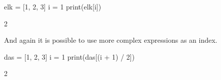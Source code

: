 \begin{minipage}[t]{0.5\textwidth}
\begin{listing}
elk = [1, 2, 3]
i = 1
print(elk[i])
\end{listing}
\end{minipage}
\begin{minipage}[t]{0.5\textwidth}
\begin{listing}
2
\end{listing}
\end{minipage}

And again it is possible to use more complex expressions as an index.

\begin{minipage}[t]{0.5\textwidth}
\begin{listing}
das = [1, 2, 3]
i = 1
print(das[(i + 1) / 2])
\end{listing}
\end{minipage}
\begin{minipage}[t]{0.5\textwidth}
\begin{listing}
2
\end{listing}
\end{minipage}
